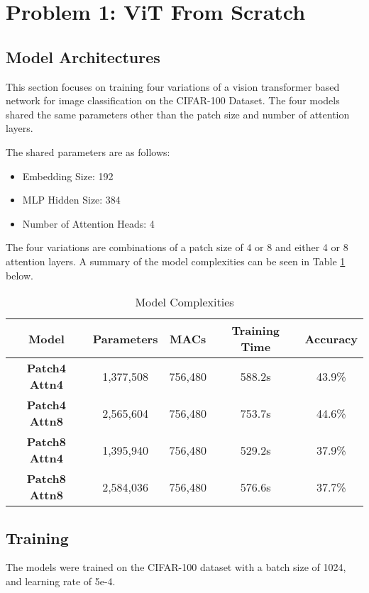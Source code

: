 \documentclass{article}
\begin{document}

\raggedright

\section{Problem 1: ViT From Scratch}
\subsection{Model Architectures}
This section focuses on training four
variations of a vision transformer based
network for image classification on the
CIFAR-100 Dataset. The four models shared the
same parameters other than the patch size and
number of attention layers.

The shared parameters are as follows:
\begin{itemize}
    \item Embedding Size: 192
    \item MLP Hidden Size: 384
    \item Number of Attention Heads: 4
\end{itemize}
The four variations are combinations of a
patch size of 4 or 8 and either 4 or 8
attention layers. A summary of the model
complexities can be seen in Table
\ref{tab:complexities} below.

\begin{table}[h]
    \centering %
    \begin{tabular}{|c|c|c|c|c|}
        \hline
        \textbf{Model} & \textbf{Parameters} & \textbf{MACs} & \textbf{Training Time} & \textbf{Accuracy}  \\
        \hline
        \textbf{Patch4 Attn4} & 1,377,508 & 756,480 & 588.2s & 43.9\% \\
        \hline
        \textbf{Patch4 Attn8} & 2,565,604 & 756,480 & 753.7s & 44.6\% \\
        \hline
        \textbf{Patch8 Attn4} & 1,395,940 & 756,480 & 529.2s & 37.9\% \\
        \hline
        \textbf{Patch8 Attn8} & 2,584,036 & 756,480 & 576.6s & 37.7\% \\
        \hline
    \end{tabular}
    \caption{Model Complexities}
    \label{tab:complexities}
\end{table}

\subsection{Training}
The models were trained on the CIFAR-100 dataset with a batch size of 1024, and learning rate of 5e-4. 
\end{document}

